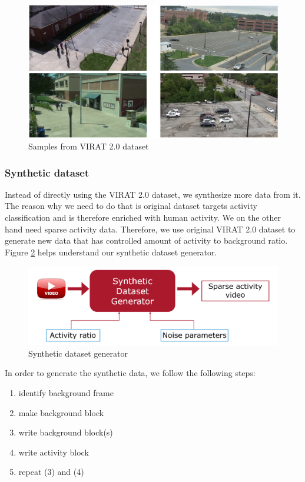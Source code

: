 \begin{figure}
    \centering
    \includegraphics[width=\linewidth]{images/virat-samples.PNG}
    \caption[Samples from VIRAT 2.0 dataset ]{Samples from VIRAT 2.0\cite{virat20} dataset }
    \label{fig:virat-samples}
\end{figure}


\subsubsection{Synthetic dataset}
\label{sec:synthetic-dataset}
Instead of directly using the VIRAT 2.0 dataset, we synthesize more data from it. The reason why we need to do that is original dataset targets activity classification and is therefore enriched with human activity. We on the other hand need sparse activity data. Therefore, we use original VIRAT 2.0 dataset to generate new data that has controlled amount of activity to background ratio. Figure \ref{fig:synthetic-dataset-generator} helps understand our synthetic dataset generator.  

\begin{figure}
    \centering
    \includegraphics[width=\linewidth]{images/synthetic-dataset-generator.PNG}
    \caption{Synthetic dataset generator}
    \label{fig:synthetic-dataset-generator}
\end{figure}

In order to generate the synthetic data, we follow the following steps:
\begin{enumerate} 
    \item identify background frame
    \item make background block
    \item write background block(s)
    \item write activity block
    \item repeat (3) and (4)
\end{enumerate}

